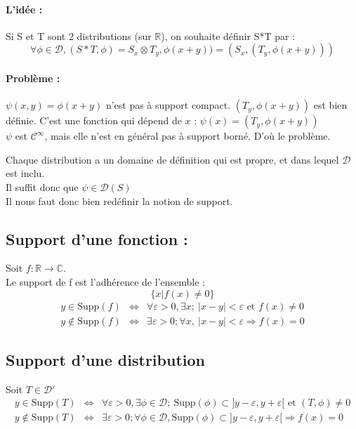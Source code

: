 \documentclass{article}
\begin{document}
\paragraph{L'idée : \\}
Si S et T sont 2 distributions (sur $\mathbb{R}$), on souhaite définir S*T par :
\[\forall \phi \in \mathcal{D}, (S*T,\phi)=S_x\otimes T_y, \phi(x+y)) = (S_x,(T_y,\phi(x+y)))\]

\paragraph{Problème : \\}
$\psi(x,y)=\phi(x+y)$ n'est pas à support compact.
$(T_y, \phi(x+y))$ est bien définie. C'est une fonction qui dépend de $x$ : $\psi(x)=(T_y,\phi(x+y))$ \\
$\psi$ est $\mathcal{C}^{\infty}$, mais elle n'est en général pas à support borné. D'où le problème.

\bigskip
Chaque distribution a un domaine de définition qui est propre, et dans lequel $\mathcal{D}$ est inclu. \\
Il suffit donc que $\psi \in \mathcal{D}(S)$\\
Il nous faut donc bien redéfinir la notion de support.

\subsection{Support d'une fonction :}
Soit $f:\mathbb{R}\rightarrow \mathbb{C}$.\\
Le support de f est l'adhérence de l'ensemble : \[\{x|f(x)\neq 0\}\]
\begin{eqnarray*}
y\in \text{Supp}(f) &\Leftrightarrow& \forall \varepsilon>0, \exists x;\ |x-y|<\varepsilon \text{ et } f(x)\neq 0 \\
y\not\in \text{Supp}(f) &\Leftrightarrow& \exists \varepsilon>0; \forall x,\ |x-y|<\varepsilon \Rightarrow f(x)=0
\end{eqnarray*}

\subsection{Support d'une distribution}
Soit $T\in \mathcal{D}'$ \\
\begin{eqnarray*}
y\in \text{Supp}(T) &\Leftrightarrow& \forall \varepsilon>0, \exists \phi\in\mathcal{D};\ \text{Supp}(\phi)\subset]y-\varepsilon,y+\varepsilon[ \text{ et } (T,\phi)\neq 0 \\
y\not\in \text{Supp}(T) &\Leftrightarrow& \exists \varepsilon>0; \forall \phi\in\mathcal{D}, \text{Supp}(\phi)\subset]y-\varepsilon,y+\varepsilon[ \Rightarrow f(x)=0
\end{eqnarray*}
\end{document}
